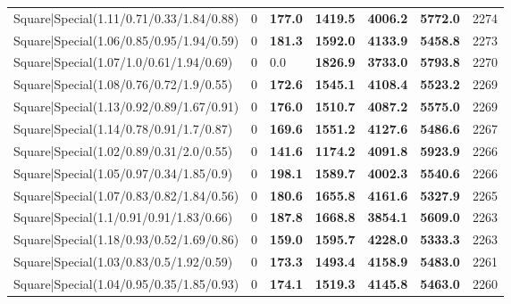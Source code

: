 \begin{tabular}{lrllllr}
 Square|Special(1.11/0.71/0.33/1.84/0.88)                      &             0   & \textbf{177.0} & \textbf{1419.5} & \textbf{4006.2} & \textbf{5772.0} &         2274 \\
 Square|Special(1.06/0.85/0.95/1.94/0.59)                      &             0   & \textbf{181.3} & \textbf{1592.0} & \textbf{4133.9} & \textbf{5458.8} &         2273 \\
 Square|Special(1.07/1.0/0.61/1.94/0.69)                       &             0   & 0.0            & \textbf{1826.9} & \textbf{3733.0} & \textbf{5793.8} &         2270 \\
 Square|Special(1.08/0.76/0.72/1.9/0.55)                       &             0   & \textbf{172.6} & \textbf{1545.1} & \textbf{4108.4} & \textbf{5523.2} &         2269 \\
 Square|Special(1.13/0.92/0.89/1.67/0.91)                      &             0   & \textbf{176.0} & \textbf{1510.7} & \textbf{4087.2} & \textbf{5575.0} &         2269 \\
 Square|Special(1.14/0.78/0.91/1.7/0.87)                       &             0   & \textbf{169.6} & \textbf{1551.2} & \textbf{4127.6} & \textbf{5486.6} &         2267 \\
 Square|Special(1.02/0.89/0.31/2.0/0.55)                       &             0   & \textbf{141.6} & \textbf{1174.2} & \textbf{4091.8} & \textbf{5923.9} &         2266 \\
 Square|Special(1.05/0.97/0.34/1.85/0.9)                       &             0   & \textbf{198.1} & \textbf{1589.7} & \textbf{4002.3} & \textbf{5540.6} &         2266 \\
 Square|Special(1.07/0.83/0.82/1.84/0.56)                      &             0   & \textbf{180.6} & \textbf{1655.8} & \textbf{4161.6} & \textbf{5327.9} &         2265 \\
 Square|Special(1.1/0.91/0.91/1.83/0.66)                       &             0   & \textbf{187.8} & \textbf{1668.8} & \textbf{3854.1} & \textbf{5609.0} &         2263 \\
 Square|Special(1.18/0.93/0.52/1.69/0.86)                      &             0   & \textbf{159.0} & \textbf{1595.7} & \textbf{4228.0} & \textbf{5333.3} &         2263 \\
 Square|Special(1.03/0.83/0.5/1.92/0.59)                       &             0   & \textbf{173.3} & \textbf{1493.4} & \textbf{4158.9} & \textbf{5483.0} &         2261 \\
 Square|Special(1.04/0.95/0.35/1.85/0.93)                      &             0   & \textbf{174.1} & \textbf{1519.3} & \textbf{4145.8} & \textbf{5463.0} &         2260 \\

\end{tabular}
